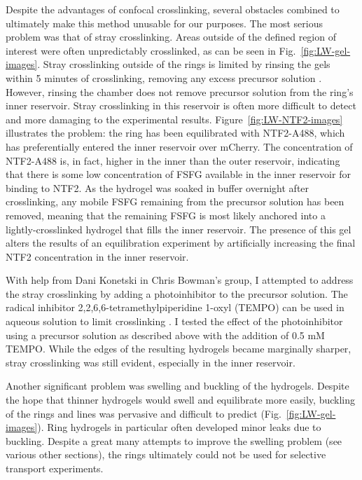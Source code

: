 Despite the advantages of confocal crosslinking, several obstacles combined to ultimately make this method unusable for our purposes.  The most serious problem was that of stray crosslinking.  Areas outside of the defined region of interest were often unpredictably crosslinked, as can be seen in Fig.~\ref{fig:LW-gel-images}.  Stray crosslinking outside of the rings is limited by rinsing the gels within 5 minutes of crosslinking, removing any excess precursor solution \cite{paustian13}.  However, rinsing the chamber does not remove precursor solution from the ring's inner reservoir.  Stray crosslinking in this reservoir is often more difficult to detect and more damaging to the experimental results. Figure~\ref{fig:LW-NTF2-images} illustrates the problem: the ring has been equilibrated with NTF2-A488, which has preferentially entered the inner reservoir over mCherry.  The concentration of NTF2-A488 is, in fact, higher in the inner than the outer reservoir, indicating that there is some low concentration of FSFG available in the inner reservoir for binding to NTF2.  As the hydrogel was soaked in buffer overnight after crosslinking, any mobile FSFG remaining from the precursor solution has been removed, meaning that the remaining FSFG is most likely anchored into a lightly-crosslinked hydrogel that fills the inner reservoir.  The presence of this gel alters the results of an equilibration experiment by artificially increasing the final NTF2 concentration in the inner reservoir.

With help from Dani Konetski in Chris Bowman's group, I attempted to address the stray crosslinking by adding a photoinhibitor to the precursor solution.  The radical inhibitor 2,2,6,6-tetramethylpiperidine 1-oxyl (TEMPO) can be used in aqueous solution to limit crosslinking \cite{chatani14}.  I tested the effect of the photoinhibitor using a precursor solution as described above with the addition of 0.5 mM TEMPO.  While the edges of the resulting hydrogels became marginally sharper, stray crosslinking was still evident, especially in the inner reservoir.


Another significant problem was swelling and buckling of the hydrogels.  Despite the hope that thinner hydrogels would swell and equilibrate more easily, buckling of the rings and lines was pervasive and difficult to predict (Fig.~\ref{fig:LW-gel-images}).  Ring hydrogels in particular often developed minor leaks due to buckling.  Despite a great many attempts to improve the swelling problem (see various other sections), the rings ultimately could not be used for selective transport experiments.

